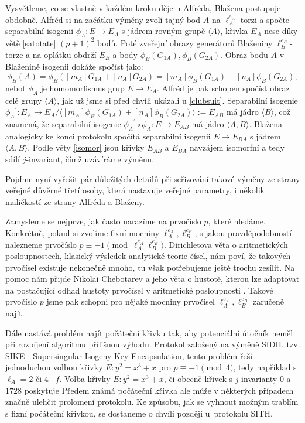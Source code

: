 \documentclass[12pt]{report}
\begin{document}
Vysvětleme, co se vlastně v každém kroku děje u Alfréda, Blažena postupuje obdobně. Alfréd si na začátku výměny zvolí tajný bod $A$ na $\ell_{A}^{e_A}$-torzi a spočte separabilní isogenii $\phi_A : E \longrightarrow E_A$ s jádrem rovným grupě $\langle A \rangle$, křivka $E_A$ nese díky větě \ref{satotate} $(p+1)^2$ bodů. Poté zveřejní obrazy generátorů Blaženiny $\ell_{B}^{e_B}$-torze a na oplátku obdrží $E_B$ a body $\phi_B (G_{1A}), \phi_B (G_{2A})$. Obraz bodu $A$ v Blaženině isogenii dokáže spočíst jako:
\begin{equation*}
\phi_B (A) = \phi_B ([m_A] G_{1A} + [n_A] G_{2A}) = [m_A] \phi_B (G_{1A}) + [n_A] \phi_B (G_{2A}),
\end{equation*}
{\hypersetup{linkcolor=black}neboť $\phi_A$ je homomorfismus grup $E \longrightarrow E_A$. Alfréd je pak schopen spočíst obraz celé grupy $\langle A \rangle$, jak už jsme si před chvíli ukázali u \eqref{clubsuit}}. Separabilní isogenie ${\phi_A}^\prime : E_A \longrightarrow E_A/\langle [m_A] \phi_B (G_{1A})+ [n_A] \phi_B (G_{2A}) \rangle := E_{AB}$ má jádro $\langle B \rangle$, což znamená, že separabilní isogenie ${\phi_A}^{\prime} \circ \phi_A : E \longrightarrow E_{AB}$ má jádro $\langle A,B \rangle$. Blažena analogicky ke konci protokolu spočítá separabilní isogenii $E \longrightarrow E_{BA}$ s jádrem $\langle A,B \rangle$. Podle věty \ref{isomor} jsou křivky $E_{AB}$ a $E_{BA}$ navzájem isomorfní a tedy sdílí $j$-invariant, čímž uzávíráme výměnu. 
 
Pojďme nyní vyřešit pár důležitých detailů při seřizování takové výměny ze strany veřejně důvěrné třetí osoby, která nastavuje veřejné parametry, i několik maličkostí ze strany Alfréda a Blaženy.

Zamysleme se nejprve, jak často narazíme na prvočíslo $p$, které hledáme. Konkrétně, pokud si zvolíme fixní mocniny $\ell_A ^{e_A}, \ell_B ^{e_B}$, s jakou pravděpodobností nalezneme  prvočíslo $p \equiv -1 \pmod{\ell_{A}^{e_A} \ell_{B}^{e_B}}$. Dirichletova věta o aritmetických posloupnostech, klasický výsledek analytické teorie čísel, nám poví, že takových prvočísel existuje nekonečně mnoho, tu však potřebujeme ještě trochu zesílit. Na pomoc nám přijde Nikolai Chebotarev a jeho věta o hustotě, kterou lze adaptovat na postačující odhad hustoty prvočísel v aritmetické posloupnosti \cite{Lagarias}. Takové prvočíslo $p$ jsme pak schopni pro nějaké mocniny prvočísel $\ell_A ^{e_A},\ell_B ^{e_B}$ zaručeně najít.

Dále nastává problém najít počáteční křivku tak, aby potenciální útočník neměl při rozbíjení algoritmu přílišnou výhodu. Protokol založený na výměně SIDH, tzv. SIKE - Supersingular Isogeny Key Encapsulation, tento problém řeší jednoduchou volbou křivky $E : y^2 = x^3+x$ pro $p \equiv -1 \pmod{4}$, tedy například s $\ell_A = 2$ či $4 \mid f$. Volba křivky $E : y^2 = x^3+x$, či obecně křivek s $j$-invarianty $0$ a $1728$ poskytuje 
Předem známá počáteční křivka ale může v některých případech značně ulehčit prolomení protokolu. Ke způsobu, jak se vyhnout možným trablím s fixní počáteční křivkou, se dostaneme o chvíli později u~protokolu SITH.
\end{document}
